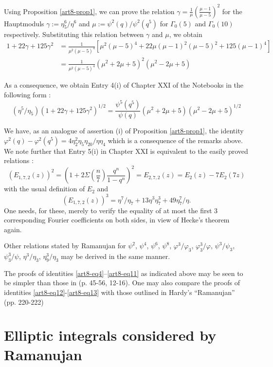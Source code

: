 \begin{remark*}
Using Proposition \ref{art8-prop1}, we can prove the relation $\gamma=\frac{1}{\mu}\left(\frac{\mu-1}{\mu-5}\right)^{2}$ for the Hauptmoduls $\gamma:=\eta^{6}_{5}/\eta^{6}$ and $\mu:=\psi^{2}(q)/\psi^{2}(q^{5})$ for $\Gamma_{0}(5)$ and $\Gamma_{0}(10)$ respectively. Substituting this relation between $\gamma$ and $\mu$, we obtain
\begin{align*}
1+22\gamma+125\gamma^{2} &=\frac{1}{\mu^{2}(\mu-5)^{4}}[\mu^{2}(\mu-5)^{4}+22\mu(\mu-1)^{2}(\mu-5)^{2}+125(\mu-1)^{4}]\\
&= \frac{1}{\mu^{2}(\mu-5)^{4}}(\mu^{2}+2\mu+5)^{2}(\mu^{2}-2\mu+5)
\end{align*}\pageoriginale 
\end{remark*}

As a consequence, we obtain Entry 4(i) of Chapter XXI of the Notebooks in the following form :
$$
(\eta^{5}/\eta_{5})(1+22\gamma+125\gamma^{2})^{1/2}=\frac{\psi^{5}(q^{5})}{\psi(q)}(\mu^{2}+2\mu+5)(\mu^{2}-2\mu+5)^{1/2}
$$

We have, as an analogue of assertion (i) of Proposition \ref{art8-prop1}, the identity $\varphi^{2}(q)-\varphi^{2}(q^{5})=4\eta^{2}_{2}\eta_{5}\eta_{20}/\eta\eta_{4}$ which is a consequence of the remarks above. We note further that Entry 5(i) in Chapter XXI is equivalent to the easily proved relations :
$$
(E_{1,7,2}(z))^{2}=\left(1+2\Sigma\left(\dfrac{n}{7}\right)\frac{q^{n}}{1-q^{n}}\right)^{2}=E_{2,7,2}(z)=E_{2}(z)-7E_{2}(7z)
$$
with the usual definition of $E_{2}$ and
$$
(E_{1,7,2}(z))^{3}=\eta^{7}/\eta_{7}+13\eta^{3}\eta^{3}_{7}+49\eta^{7}_{7}/\eta.
$$
One needs, for these, merely to verify the equality of at most the first 3 corresponding Fourier coefficients on both sides, in view of Hecke's theorem again.

Other relations stated by Ramanujan for $\psi^{2}$, $\psi^{4}$, $\psi^{6}$, $\psi^{8}$, $\varphi^{3}/\varphi_{3}$, $\varphi^{3}_{3}/\varphi$, $\psi^{3}/\psi_{3}$, $\psi^{3}_{3}/\psi$, $\eta^{3}/\eta_{3}$, $\eta^{3}_{9}/\eta_{3}$ may be derived in the same manner.

The proofs of identities \eqref{art8-eq4}--\eqref{art8-eq11} as indicated above may be seen to be simpler than those in \cite{art8-key1} (p. 45-56, 12-16). One may also compare the proofs of identities \eqref{art8-eq12}-\eqref{art8-eq13} with those outlined in Hardy's ``Ramanujan'' (pp. 220-222)

\section{Elliptic integrals considered by Ramanujan}
~

